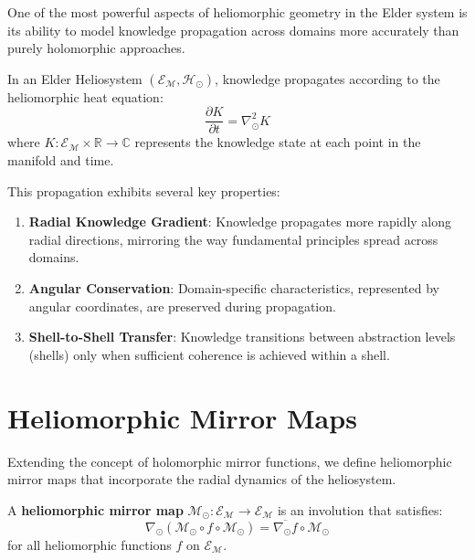One of the most powerful aspects of heliomorphic geometry in the Elder system is its ability to model knowledge propagation across domains more accurately than purely holomorphic approaches.

\begin{proposition}
In an Elder Heliosystem $(\mathcal{E}_{\mathcal{M}}, \mathcal{H}_{\odot})$, knowledge propagates according to the heliomorphic heat equation:
\begin{equation}
\frac{\partial K}{\partial t} = \nabla_{\odot}^2 K
\end{equation}
where $K: \mathcal{E}_{\mathcal{M}} \times \mathbb{R} \rightarrow \mathbb{C}$ represents the knowledge state at each point in the manifold and time.
\end{proposition}

This propagation exhibits several key properties:

\begin{enumerate}
    \item \textbf{Radial Knowledge Gradient}: Knowledge propagates more rapidly along radial directions, mirroring the way fundamental principles spread across domains.
    
    \item \textbf{Angular Conservation}: Domain-specific characteristics, represented by angular coordinates, are preserved during propagation.
    
    \item \textbf{Shell-to-Shell Transfer}: Knowledge transitions between abstraction levels (shells) only when sufficient coherence is achieved within a shell.
\end{enumerate}

\section{Heliomorphic Mirror Maps}

Extending the concept of holomorphic mirror functions, we define heliomorphic mirror maps that incorporate the radial dynamics of the heliosystem.

\begin{definition}
A \textbf{heliomorphic mirror map} $\mathcal{M}_{\odot}: \mathcal{E}_{\mathcal{M}} \rightarrow \mathcal{E}_{\mathcal{M}}$ is an involution that satisfies:
\begin{equation}
\nabla_{\odot} (\mathcal{M}_{\odot} \circ f \circ \mathcal{M}_{\odot}) = \overline{\nabla_{\odot} f} \circ \mathcal{M}_{\odot}
\end{equation}
for all heliomorphic functions $f$ on $\mathcal{E}_{\mathcal{M}}$.
\end{definition}

